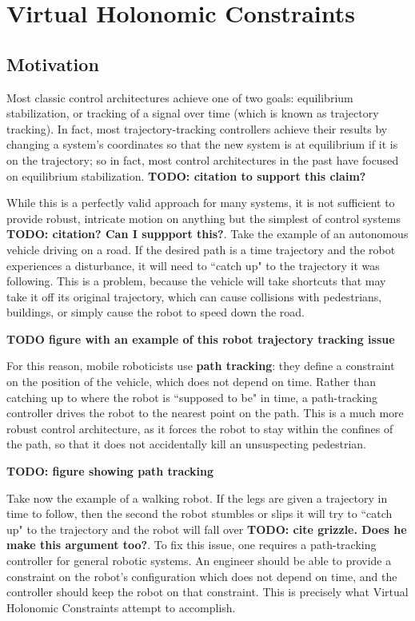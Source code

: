 
\section{Virtual Holonomic Constraints}\label{sec:vhcs}

\subsection{Motivation}
Most classic control architectures achieve one of two goals: equilibrium
stabilization, or tracking of a signal over time (which is known as
trajectory tracking). In fact, most trajectory-tracking controllers achieve
their results by changing a system's coordinates so that the new system is at
equilibrium if it is on the trajectory; so in fact, most control architectures
in the past have focused on equilibrium stabilization. \textbf{TODO: citation to
support this claim?}

While this is a perfectly valid approach for many systems, it is not sufficient
to provide robust, intricate motion on anything but the simplest of control
systems \textbf{TODO: citation? Can I suppport this?}. Take the example of an
autonomous vehicle driving on a road. If the desired path is a time trajectory 
and the robot experiences a disturbance, it will need to ``catch up" to the
trajectory it was following. This is a problem, because the vehicle will take
shortcuts that may take it off its original trajectory, which can cause
collisions with pedestrians, buildings, or simply cause the robot to speed down
the road.

\textbf{TODO figure with an example of this robot trajectory tracking issue}

For this reason, mobile roboticists use \textbf{path tracking}:
they define a constraint on the position of the vehicle, which does not depend on
time. Rather than catching up to where the robot is ``supposed to be" in time, a
path-tracking controller drives the robot to the nearest point on the path. This
is a much more robust control architecture, as it forces the robot to stay
within the confines of the path, so that it does not accidentally kill an
unsuspecting pedestrian.

\textbf{TODO: figure showing path tracking}

Take now the example of a walking robot. If the legs are given a trajectory in
time to follow, then the second the robot stumbles or slips it will try to
``catch up" to the trajectory and the robot will fall over \textbf{TODO: cite
grizzle. Does he make this argument too?}.  To fix this issue, one requires a
path-tracking controller for general robotic systems. An engineer should be able
to provide a constraint on the robot's configuration which does not depend on
time, and the controller should keep the robot on that constraint. This is
precisely what Virtual Holonomic Constraints attempt to accomplish.

